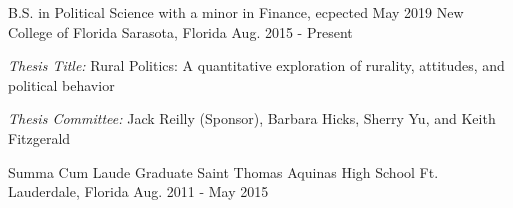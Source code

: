 

\begin{cventries}

  \cventry
    {B.S. in Political Science with a minor in Finance, ecpected May 2019} %
    {New College of Florida} %
    {Sarasota, Florida} %
    {Aug. 2015 - Present} %
    {
    \begin{cvitems}
      \item \emph{Thesis Title:} Rural Politics: A quantitative exploration of rurality, attitudes, and political behavior
      \item \emph{Thesis Committee:} Jack Reilly (Sponsor), Barbara Hicks, Sherry Yu, and Keith Fitzgerald 
    \end{cvitems}
  }

  \cventry
    {Summa Cum Laude Graduate} %
    {Saint Thomas Aquinas High School} %
    {Ft. Lauderdale, Florida} %
    {Aug. 2011 - May 2015} %
    {}


\vspace{-.1cm}


\end{cventries}
